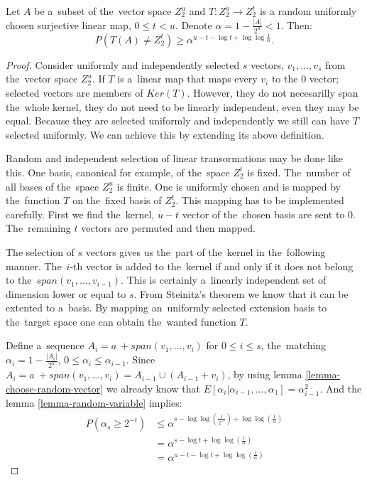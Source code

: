 \begin{theorem}
\label{theorem-linear-function-set-onto}
Let $A$ be a~subset of the~vector space $Z_2^u$ and $T: Z_2^u \rightarrow Z_2^t$ is a random uniformly chosen surjective linear map, $0 \leq t < u$. Denote $\alpha = 1 - \frac{|A|}{2^u} < 1$. Then:
\begin{displaymath}
P(T(A) \neq Z_2^t) \geq \alpha^{u - t - \log t + \log \log \frac{1}{\alpha}} \textit{.}
\end{displaymath}
\end{theorem}
\begin{proof}
Consider uniformly and independently selected $s$ vectors, $v_1, \dots, v_s$ from the~vector space $Z_2^u$. If $T$ is a~linear map that maps every $v_i$ to the $0$ vector; selected vectors are members of $Ker(T)$. However, they do not necesarilly span the~whole kernel, they do not need to be linearly independent, even they may be equal. Because they are selected uniformly and independently we still can have $T$ selected uniformly. We can achieve this by extending its above definition. 

Random and independent selection of linear transormations may be done like this. One basis, canonical for example, of the~space $Z_2^t$ is fixed. The~number of all bases of the~space $Z_2^u$ is finite. One is uniformly chosen and is mapped by the~function $T$ on the~fixed basis of $Z_2^t$. This mapping has to be implemented carefully. First we find the~kernel, $u-t$ vector of the~chosen basis are sent to $0$. The~remaining $t$ vectors are permuted and then mapped.

The selection of $s$ vectors gives us the~part of the~kernel in the~following manner. The~$i$-th vector is added to the~kernel if and only if it does not belong to the~$span(v_1, \dots, v_{i-1})$. This is certainly a~linearly independent set of dimension lower or equal to $s$. From Steinitz's theorem we know that it can be extented to a~basis. By mapping an~uniformly selected extension basis to the~target space one can obtain the~wanted function $T$.

Define a~sequence $A_i = a~+ span(v_1, \dots, v_i)$ for $0 \leq i \leq s$, the~matching $\alpha_i = 1 - \frac{|A_i|}{2^u}$, $0 \leq \alpha_i \leq \alpha_{i-1}$. Since $A_{i} = a~+ span(v_1, \dots, v_i) = A_{i-1} \cup (A_{i-1} + v_i)$, by using lemma \ref{lemma-choose-random-vector} we already know that $E[\alpha_i | \alpha_{i-1}, \dots, \alpha_1] = \alpha_{i-1}^2$. And the lemma \ref{lemma-random-variable} implies:
\begin{displaymath}
\begin{split}
P(\alpha_s \geq 2^{-t}) 
	& \leq \alpha^{s - \log \log (\frac{1}{2^{-t}}) + \log \log (\frac{1}{\alpha})} \\
	& = \alpha^{s - \log t + \log \log (\frac{1}{\alpha})} \\
	& = \alpha^{u - t - \log t + \log \log (\frac{1}{\alpha})}
\end{split}
\end{displaymath}


\end{proof}
